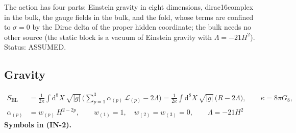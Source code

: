\documentclass[
  10pt,
]{article}
\begin{document}
The action has four parts: Einstein gravity in eight dimensions,
dirac16complex in the bulk, the gauge fields in the bulk, and the fold,
whose terms are confined to \(\sigma = 0\) by the Dirac delta of the
proper hidden coordinate; the bulk needs no other source (the static
block is a vacuum of Einstein gravity with \(\Lambda = -21H^2\)).
Status: ASSUMED.

\hypertarget{gravity}{%
\subsection{Gravity}\label{gravity}}

\[
\begin{aligned}
S_{\mathrm{EL}} &= \frac{1}{2\kappa}\int\mathrm{d}^8X\,\sqrt{\lvert g\rvert}\,\Big(\sum_{p=1}^{3}\alpha_{(p)}\,\mathcal{L}_{(p)}
 - 2\Lambda\Big) = \frac{1}{2\kappa}\int\mathrm{d}^8X\,\sqrt{\lvert g\rvert}\,\big(R - 2\Lambda\big),\qquad \kappa = 8\pi G_8,\\
\alpha_{(p)} &= w_{(p)}\,H^{2-2p},\qquad w_{(1)} = 1,\quad w_{(2)} = w_{(3)} = 0,\qquad \Lambda = -21H^2
\end{aligned} \tag{IN-2}
\] \textbf{Symbols in (IN-2).}
\end{document}

